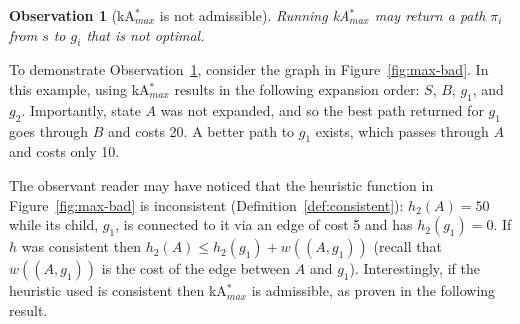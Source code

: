 \documentclass{aicom2e}
\newtheorem{observation}{Observation}
\newcommand{\kastar}{kA$^*$}
\newcommand{\kastarmax}{kA$^*_{max}$}
\newcommand{\maxf}{$F_{max}(n)$}
\newcommand{\roni}[1]{\textbf{[RS:#1]}}
\begin{document}
 \begin{observation}[\kastarmax{} is not admissible]
    Running \kastarmax{} may return a path $\pi_i$ from $s$ to $g_i$ that is not optimal.
    \label{obs:max-f-inadmissible}
 \end{observation}


To demonstrate Observation~\ref{obs:max-f-inadmissible}, consider the graph in
Figure~\ref{fig:max-bad}. In this example, using \kastarmax{} results in the
following expansion order: $S$, $B$, $g_1$, and $g_2$. Importantly, state $A$ was not expanded, and so the best path returned for $g_1$ goes
through $B$ and costs 20. A better path to $g_1$ exists, which passes through $A$ and costs only 10.




The observant reader may have noticed that the heuristic function in
Figure~\ref{fig:max-bad} is inconsistent (Definition~\ref{def:consistent}):
$h_2(A)=50$ while its child, $g_1$, is connected to it via an edge of
cost 5 and has $h_2(g_1)=0$. If $h$ was consistent then $h_2(A)\leq
h_2(g_1)+w((A,g_1))$ (recall that $w((A,g_1))$ is the cost of the edge between $A$ and $g_1$).
Interestingly, if the heuristic used is consistent then \kastarmax{} is admissible, as proven in the following result. %



\end{document}
